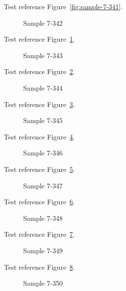 Test reference Figure~\ref{fig:sample-7-341}.

\begin{figure}[tbhp]
\caption{Sample 7-342}
\label{fig:sample-7-342}
\end{figure}

Test reference Figure~\ref{fig:sample-7-342}.

\begin{figure}[tbhp]
\caption{Sample 7-343}
\label{fig:sample-7-343}
\end{figure}

Test reference Figure~\ref{fig:sample-7-343}.

\begin{figure}[tbhp]
\caption{Sample 7-344}
\label{fig:sample-7-344}
\end{figure}

Test reference Figure~\ref{fig:sample-7-344}.

\begin{figure}[tbhp]
\caption{Sample 7-345}
\label{fig:sample-7-345}
\end{figure}

Test reference Figure~\ref{fig:sample-7-345}.

\begin{figure}[tbhp]
\caption{Sample 7-346}
\label{fig:sample-7-346}
\end{figure}

Test reference Figure~\ref{fig:sample-7-346}.

\begin{figure}[tbhp]
\caption{Sample 7-347}
\label{fig:sample-7-347}
\end{figure}

Test reference Figure~\ref{fig:sample-7-347}.

\begin{figure}[tbhp]
\caption{Sample 7-348}
\label{fig:sample-7-348}
\end{figure}

Test reference Figure~\ref{fig:sample-7-348}.

\begin{figure}[tbhp]
\caption{Sample 7-349}
\label{fig:sample-7-349}
\end{figure}

Test reference Figure~\ref{fig:sample-7-349}.

\begin{figure}[tbhp]
\caption{Sample 7-350}
\label{fig:sample-7-350}
\end{figure}

